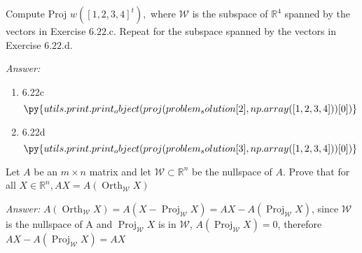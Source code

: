 \documentclass[letterpaper]{article}
\newcommand{\ans}{\textit{Answer: }}
\newenvironment{question}[2][Question]{\begin{trivlist}
\item[\hskip \labelsep {\bfseries #1}\hskip \labelsep {\bfseries #2.}]}{\end{trivlist}}
\newcommand{\printobj}[1]{\py{utils.print.print_object(#1)}}
\begin{document}
\begin{question}{6.24}
  Compute Proj $w\left([1,2,3,4]^{t}\right),$ where $\mathcal{W}$ is the subspace of $\mathbb{R}^{4}$ spanned by the
  vectors in Exercise $6.22 . \mathrm{c} .$ Repeat for the subspace spanned by the vectors in
  Exercise $6.22 . \mathrm{d} .$
  
  \ans 

  \begin{enumerate}[label=(\alph*)]
    \item 6.22c 
    $$\printobj{proj(problem_solution[2], np.array([1,2,3,4]))[0]}$$
    \item 6.22d 
    $$\printobj{proj(problem_solution[3], np.array([1,2,3,4]))[0]}$$
  \end{enumerate}

\end{question}

\begin{question}{6.27}
  Let $A$ be an $m \times n$ matrix and let $\mathcal{W} \subset \mathbb{R}^{n}$ be the nullspace of $A .$ Prove that for
  all $X \in \mathbb{R}^{n}, A X=A\left(\operatorname{Orth}_{\mathcal{W}} X\right)$
  
  \ans $A\left(\operatorname{Orth}_{\mathcal{W}} X\right) 
  = A(X - \operatorname{Proj}_{\mathcal{W}} X)
  = AX - A(\operatorname{Proj}_{\mathcal{W}} X)$, since $\mathcal{W}$ is the nullspace of A and 
  $\operatorname{Proj}_{\mathcal{W}} X$ is in $\mathcal{W}$, $A(\operatorname{Proj}_{\mathcal{W}} X) = 0$,
  therefore $AX - A(\operatorname{Proj}_{\mathcal{W}} X) = AX$
\end{question}
\end{document}
